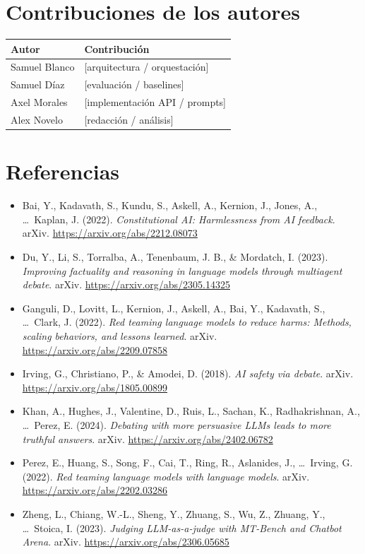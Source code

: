 \documentclass[10pt]{article}
\begin{document}
\section*{Contribuciones de los autores}

\begin{table}[h]
\centering
\small
\begin{tabularx}{\textwidth}{@{}L{4cm} X@{}}
\toprule
Autor & Contribución \\
\midrule
Samuel Blanco & [arquitectura / orquestación] \\
Samuel Díaz & [evaluación / baselines] \\
Axel Morales & [implementación API / prompts] \\
Alex Novelo & [redacción / análisis] \\
\bottomrule
\end{tabularx}
\end{table}

\section*{Referencias}

\begin{itemize}[leftmargin=*,label={}]
  \item Bai, Y., Kadavath, S., Kundu, S., Askell, A., Kernion, J., Jones, A., \dots\
  Kaplan, J. (2022). \textit{Constitutional AI: Harmlessness from AI feedback}. arXiv.
  \url{https://arxiv.org/abs/2212.08073}
  \item Du, Y., Li, S., Torralba, A., Tenenbaum, J. B., \& Mordatch, I. (2023).
  \textit{Improving factuality and reasoning in language models through multiagent
  debate}. arXiv. \url{https://arxiv.org/abs/2305.14325}
  \item Ganguli, D., Lovitt, L., Kernion, J., Askell, A., Bai, Y., Kadavath, S., \dots\
  Clark, J. (2022). \textit{Red teaming language models to reduce harms: Methods, scaling
  behaviors, and lessons learned}. arXiv. \url{https://arxiv.org/abs/2209.07858}
  \item Irving, G., Christiano, P., \& Amodei, D. (2018). \textit{AI safety via debate}.
  arXiv. \url{https://arxiv.org/abs/1805.00899}
  \item Khan, A., Hughes, J., Valentine, D., Ruis, L., Sachan, K., Radhakrishnan, A.,
  \dots\ Perez, E. (2024). \textit{Debating with more persuasive LLMs leads to more
  truthful answers}. arXiv. \url{https://arxiv.org/abs/2402.06782}
  \item Perez, E., Huang, S., Song, F., Cai, T., Ring, R., Aslanides, J., \dots\ Irving,
  G. (2022). \textit{Red teaming language models with language models}. arXiv.
  \url{https://arxiv.org/abs/2202.03286}
  \item Zheng, L., Chiang, W.-L., Sheng, Y., Zhuang, S., Wu, Z., Zhuang, Y., \dots\
  Stoica, I. (2023). \textit{Judging LLM-as-a-judge with MT-Bench and Chatbot Arena}.
  arXiv. \url{https://arxiv.org/abs/2306.05685}
\end{itemize}
\end{document}
